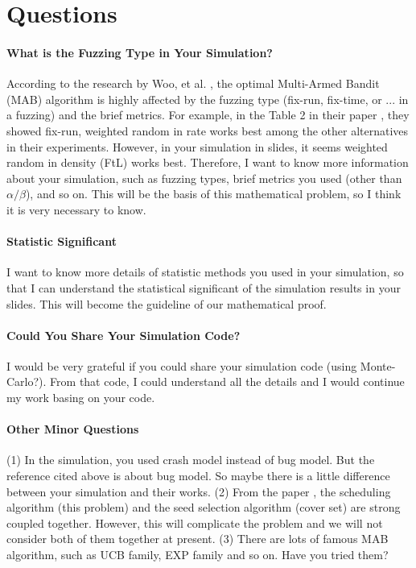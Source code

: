 
\section{Questions}

\paragraph{What is the Fuzzing Type in Your Simulation?} According to the research by Woo, et al. \cite{Woo2013}, the optimal 
Multi-Armed Bandit (MAB) algorithm is highly affected by the fuzzing type (fix-run, fix-time, or ... in a fuzzing) and the
brief metrics. For example, in the Table 2 in their paper \cite{Woo2013}, they showed fix-run, weighted random in rate works best
among the other alternatives in their experiments. However, in your simulation in slides, it seems weighted random in density (FtL) works
best. Therefore, I want to know more information about your simulation, such as fuzzing types, brief metrics you used (other than
$\alpha/\beta$), and so on. This will be the basis of this mathematical problem, so I think it is very necessary to know.

\paragraph{Statistic Significant} I want to know more details of statistic methods you used in your simulation, so that I can 
understand the statistical significant of the simulation results in your slides. This will become the guideline of our mathematical
proof. 

\paragraph{Could You Share Your Simulation Code?} I would be very grateful if you could share your simulation code (using Monte-Carlo?).
From that code, I could understand all the details and I would continue my work basing on your code.

\paragraph{Other Minor Questions} (1) In the simulation, you used crash model instead of bug model. But the reference cited above \cite{Woo2013}
is about bug model. So maybe there is a little difference between your simulation and their works. (2) From the paper \cite{Rebert2014}, 
the scheduling algorithm (this problem) and the seed selection algorithm (cover set) are strong coupled together. However, this will complicate
the problem and we will not consider both of them together at present. (3) There are lots of famous MAB algorithm, such as UCB family, EXP family and 
so on. Have you tried them?

